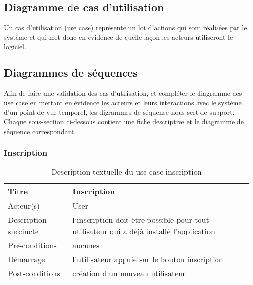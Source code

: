 \subsection{Diagramme de cas d'utilisation} %
\label{sub:diagrammes_de_cas_d_utilisation}
Un cas d’utilisation (use case) représente un lot d’actions qui sont réalisées par le système et qui met donc en évidence de quelle façon les acteurs utiliseront le logiciel.


\subsection{Diagrammes de séquences} %
\label{sub:diagrammes_de_séquence}
Afin de faire une validation des cas d'utilisation, et compléter le diagramme des use case en mettant en
évidence les acteurs et leurs interactions avec le système d’un point de vue temporel, les digrammes de séquence nous sert de support.\newline
Chaque sous-section ci-dessous contient une fiche descriptive et le diagramme de séquence correspondant.
\subsubsection{Inscription} %
\begin{table}[H]
\begin{center}
    \begin{tabular}{ | l | p{10cm} |}
    \hline
    Titre & Inscription \\ \hline
    Acteur(s) & User \\ \hline
    Description succincte & l'inscription doit être possible pour tout utilisateur qui a déjà installé l'application \\ \hline
    Pré-conditions & aucunes \\ \hline
    Démarrage & l'utilisateur appuie sur le bouton inscription \\ \hline
    Post-conditions & création d'un nouveau utilisateur \\ \hline
    \end{tabular}
    \caption{Description textuelle du use case inscription}
\end{center}
\end{table}

